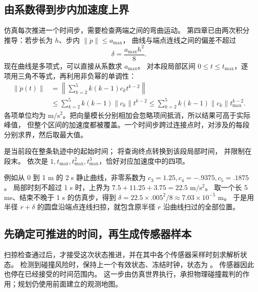 \subsection{由系数得到步内加速度上界}
仿真每次推进一个时间步，需要检查两端之间的弯曲运动。
第四章已由两次积分推导：若步长为 $h$、步内 $\|\ddot p\|\leq a_{\max}$，
曲线与端点连线之间的偏差不超过
\begin{equation}\delta=\frac{a_{\max}h^2}{8}.\end{equation}
现在曲线是多项式，可以直接从系数求 $a_{\max}$。
对本段局部区间 $0\leq t\leq t_{\max}$，逐项用三角不等式，再利用非负幂的单调性：
\begin{align}
\|\ddot p(t)\|&=\left\|\sum_{k=2}^5 k(k-1)c_k t^{k-2}\right\|\\
&\leq\sum_{k=2}^5 k(k-1)\|c_k\|t^{k-2}
\leq\sum_{k=2}^5 k(k-1)\|c_k\|t_{\max}^{k-2}.
\end{align}
各项单位均为 $\mathrm{m/s^2}$。把向量模长分别相加会忽略项间抵消，所以结果可高于实际峰值，
但整个区间的加速度都被覆盖。一个时间步跨过连接点时，对涉及的每段分别求界，然后取最大值。

\par\noindent\begin{minipage}{\linewidth}

\end{minipage}\par
{} 是当前段在整条轨迹中的起始时间； 将查询终点转换到该段局部时间，
并限制在段末。 依次是 $1,t_{\max},t_{\max}^2,t_{\max}^3$，恰好对应加速度中的四项。

例如从 0 到 1 m 的 2 s 静止曲线，非零系数为 $c_3=1.25,c_4=-.9375,c_5=.1875$。
局部时刻不超过 1 s 时，上界为 $7.5+11.25+3.75=22.5$ $\mathrm{m/s^2}$。
取一个长 5 ms、结束不晚于 1 s 的仿真步，得到
$\delta=22.5\times.005^2/8\approx7.03\times10^{-5}$ m。
于是用半径 $r+\delta$ 的圆盘沿端点连线扫掠，就包含原半径 $r$ 沿曲线扫过的全部位置。

\subsection{先确定可推进的时间，再生成传感器样本}
扫掠检查通过后，才接受这次状态推进，并在其中各个传感器采样时刻求解析状态。
检测到碰撞风险时，保持上一个有效状态、冻结时钟，状态为 。
传感器因此也停在已经接受的时间范围内。
这一步由仿真世界执行，承担物理碰撞裁判的作用；规划仍使用前面建立的观测地图。

